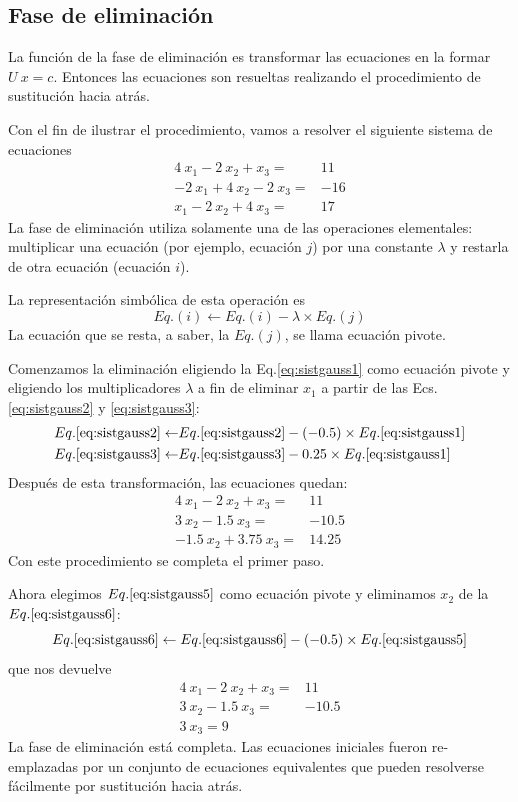 \subsection{Fase de eliminación}
La función de la fase de eliminación es transformar las ecuaciones en la formar $U \: x = c$. Entonces las ecuaciones son resueltas realizando el procedimiento de sustitución hacia atrás.
\par
Con el fin de ilustrar el procedimiento, vamos a resolver el siguiente sistema de ecuaciones
\begin{eqnarray}
4 \: x_{1} - 2 \: x_{2} + x_{3} =& 11 \label{eq:sistgauss1}\\
-2 \: x_{1} + 4 \: x_{2} - 2 \: x_{3} =& -16 \label{eq:sistgauss2} \\
x_{1} - 2 \: x_{2} + 4 \: x_{3} =& 17 \label{eq:sistgauss3}
\end{eqnarray}
La fase de eliminación utiliza solamente una de las operaciones elementales: multiplicar una ecuación (por ejemplo, ecuación $j$) por una constante $\lambda$ y restarla de otra ecuación (ecuación $i$). 
\par
La representación simbólica de esta operación es
\[Eq.(i) \leftarrow Eq.(i) - \lambda \times Eq.(j)\]
La ecuación que se resta, a saber, la $Eq.(j)$, se llama ecuación pivote.
\par
Comenzamos la eliminación eligiendo la Eq.\eqref{eq:sistgauss1} como ecuación pivote y eligiendo los multiplicadores $\lambda$ a fin de eliminar $x_{1}$ a partir de las Ecs. \eqref{eq:sistgauss2} y \eqref{eq:sistgauss3}:
\[ \begin{split}
Eq.\eqref{eq:sistgauss2} \leftarrow& Eq.\eqref{eq:sistgauss2} - (-0.5) \times Eq.\eqref{eq:sistgauss1} \\
Eq.\eqref{eq:sistgauss3} \leftarrow&Eq.\eqref{eq:sistgauss3} - 0.25 \times Eq.\eqref{eq:sistgauss1}
\end{split}\]
Después de esta transformación, las ecuaciones quedan:
\begin{align}
4 \: x_{1} - 2 \: x_{2} + x_{3} =& 11 \label{eq:sistgauss4}\\
3 \: x_{2} -1.5 \: x_{3} =& -10.5 \label{eq:sistgauss5} \\
-1.5 \: x_{2} + 3.75 \: x_{3} =& 14.25 \label{eq:sistgauss6}
\end{align}
Con este procedimiento se completa el primer paso.
\par
Ahora elegimos $Eq. \eqref{eq:sistgauss5}$ como ecuación pivote y eliminamos $x_{2}$ de la $Eq. \eqref{eq:sistgauss6}$:
\[ Eq.\eqref{eq:sistgauss6} \leftarrow Eq.\eqref{eq:sistgauss6} - (-0.5) \times Eq. \eqref{eq:sistgauss5}\]
que nos devuelve
\begin{align}
4 \: x_{1} - 2 \: x_{2} + x_{3} =& 11 \label{eq:sistgauss7} \\
3 \: x_{2} - 1.5 \: x_{3} =& -10.5 \label{eq:sistgauss8} \\
3 \: x_{3} = 9 \label{eq:sistgauss9}
\end{align}
La fase de eliminación está completa. Las ecuaciones iniciales fueron re-emplazadas por un conjunto de ecuaciones equivalentes que pueden resolverse fácilmente por sustitución hacia atrás.

